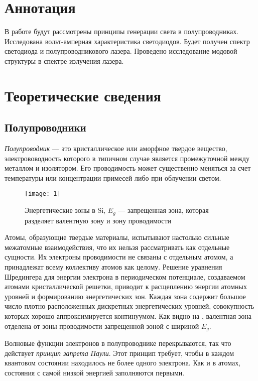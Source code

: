 \documentclass[a4paper, 12pt]{article}
\begin{document}

\section{Аннотация}
В работе будут рассмотрены принципы генерации света в полупроводниках.
Исследована вольт-амперная характеристика светодиодов. Будет получен
спектр светодиода и полупроводникового лазера. Проведено исследование
модовой структуры в спектре излучения лазера.

\section{Теоретические сведения}
\subsection{Полупроводники}


\emph{Полупроводник} --- это кристаллическое или аморфное твердое
вещество, электрововодность которого в типичном случае является
промежуточной между металлом и изолятором. Его проводимость может
существенно меняться за счет температуры или концентрации примесей
либо при облучении светом. 


\begin{wrapfigure}{r}{0.35\linewidth}
    \texttt{[image: 1]}
    \caption{Энергетические зоны в Si, $E_{g}$ --- запрещенная зона,
    которая разделяет валентную зону и зону проводимости}
    \label{fig:1}
\end{wrapfigure}

Атомы, образующие твердые материалы, испытывают настолько сильные
межатомные взаимодействия, что их нельзя рассматривать как отдельные
сущности. Их электроны проводимости не связаны с отдельным атомом, а
принадлежат всему коллективу атомов как целому. Решение уравнения
Шредингера для энергии электрона в периодическом потенциале,
создаваемом атомами кристаллической решетки, приводит к расщеплению
энергии атомных уровней и формированию энергетических зон. Каждая зона
содержит большое число плотно расположенных дискретных энергетических
уровней, совокупность которых хорошо аппроксимируется континуумом. Как
видно на , валентная зона отделена от зоны проводимости
запрещенной зоной с шириной $E_{g}$.


Волновые функции электронов в полупроводнике перекрываются, так что
действует \emph{принцип запрета Паули}. Этот принцип требует, чтобы в
каждом квантовом состоянии находилось не более одного электрона. Как и
в атомах, состояния с самой низкой энергией заполняются первыми.
\end{document}
